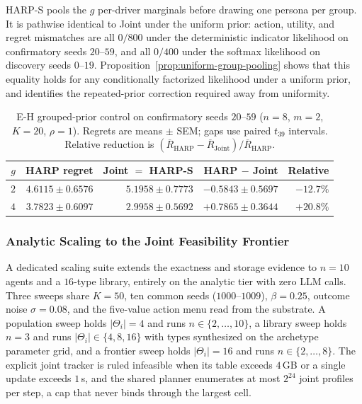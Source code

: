 HARP-S pools the $g$ per-driver marginals before drawing one persona per group. It is pathwise identical to Joint under the uniform prior: action, utility, and regret mismatches are all $0/800$ under the deterministic indicator likelihood on confirmatory seeds $20$--$59$, and all $0/400$ under the softmax likelihood on discovery seeds $0$--$19$. Proposition~\ref{prop:uniform-group-pooling} shows that this equality holds for any conditionally factorized likelihood under a uniform prior, and identifies the repeated-prior correction required away from uniformity.

\begin{table}[t]
\centering\scriptsize
\caption{E-H grouped-prior control on confirmatory seeds $20$--$59$ ($n{=}8$, $m{=}2$, $K{=}20$, $\rho{=}1$). Regrets are means $\pm$ SEM; gaps use paired $t_{39}$ intervals. Relative reduction is $(\overline R_{\mathrm{HARP}}-\overline R_{\mathrm{Joint}})/\overline R_{\mathrm{HARP}}$.}
\label{tab:maassim-grouped-prior}
\setlength{\tabcolsep}{3pt}
\begin{tabular}{crrrr}
\toprule
$g$ & HARP regret & Joint $=$ HARP-S & HARP $-$ Joint & Relative \\
\midrule
$2$ & $4.6115\pm0.6576$ & $5.1958\pm0.7773$ & $-0.5843\pm0.5697$ & $-12.7\%$ \\
$4$ & $3.7823\pm0.6097$ & $2.9958\pm0.5692$ & $+0.7865\pm0.3644$ & $+20.8\%$ \\
\bottomrule
\end{tabular}
\end{table}

\subsubsection{Analytic Scaling to the Joint Feasibility Frontier}
\label{app:scaling}

A dedicated scaling suite extends the exactness and storage evidence to $n{=}10$ agents and a $16$-type library, entirely on the analytic tier with zero LLM calls. Three sweeps share $K{=}50$, ten common seeds ($1000$--$1009$), $\beta{=}0.25$, outcome noise $\sigma{=}0.08$, and the five-value action menu read from the substrate. A population sweep holds $|\Theta_i|{=}4$ and runs $n\in\{2,\dots,10\}$, a library sweep holds $n{=}3$ and runs $|\Theta_i|\in\{4,8,16\}$ with types synthesized on the archetype parameter grid, and a frontier sweep holds $|\Theta_i|{=}16$ and runs $n\in\{2,\dots,8\}$. The explicit joint tracker is ruled infeasible when its table exceeds $4$\,GB or a single update exceeds $1$\,s, and the shared planner enumerates at most $2^{24}$ joint profiles per step, a cap that never binds through the largest cell.

